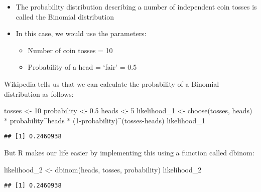 \documentclass[
  12pt,
]{article}
\newenvironment{Shaded}{\begin{snugshade}}{\end{snugshade}}
\newcommand{\DecValTok}[1]{\textcolor[rgb]{0.00,0.00,0.81}{#1}}
\newcommand{\FloatTok}[1]{\textcolor[rgb]{0.00,0.00,0.81}{#1}}
\newcommand{\FunctionTok}[1]{\textcolor[rgb]{0.00,0.00,0.00}{#1}}
\newcommand{\NormalTok}[1]{#1}
\newcommand{\OtherTok}[1]{\textcolor[rgb]{0.56,0.35,0.01}{#1}}
\newcommand{\SpecialCharTok}[1]{\textcolor[rgb]{0.00,0.00,0.00}{#1}}
\providecommand{\tightlist}{%
  \setlength{\itemsep}{0pt}\setlength{\parskip}{0pt}}
\begin{document}
\begin{itemize}
\tightlist
\item
  The probability distribution describing a number of independent coin
  tosses is called the Binomial distribution
\item
  In this case, we would use the parameters:

  \begin{itemize}
  \tightlist
  \item
    Number of coin tosses = 10
  \item
    Probability of a head = `fair' = 0.5
  \end{itemize}
\end{itemize}

Wikipedia tells us that we can calculate the probability of a Binomial
distribution as follows:

\begin{Shaded}
\begin{Highlighting}[]
\NormalTok{tosses }\OtherTok{\textless{}{-}} \DecValTok{10}
\NormalTok{probability }\OtherTok{\textless{}{-}} \FloatTok{0.5}
\NormalTok{heads }\OtherTok{\textless{}{-}} \DecValTok{5}
\NormalTok{likelihood\_1 }\OtherTok{\textless{}{-}} \FunctionTok{choose}\NormalTok{(tosses, heads) }\SpecialCharTok{*}\NormalTok{ probability}\SpecialCharTok{\^{}}\NormalTok{heads }\SpecialCharTok{*}
\NormalTok{                (}\DecValTok{1}\SpecialCharTok{{-}}\NormalTok{probability)}\SpecialCharTok{\^{}}\NormalTok{(tosses}\SpecialCharTok{{-}}\NormalTok{heads)}
\NormalTok{likelihood\_1}
\end{Highlighting}
\end{Shaded}

\begin{verbatim}
## [1] 0.2460938
\end{verbatim}

But R makes our life easier by implementing this using a function called
dbinom:

\begin{Shaded}
\begin{Highlighting}[]
\NormalTok{likelihood\_2 }\OtherTok{\textless{}{-}} \FunctionTok{dbinom}\NormalTok{(heads, tosses, probability)}
\NormalTok{likelihood\_2}
\end{Highlighting}
\end{Shaded}

\begin{verbatim}
## [1] 0.2460938
\end{verbatim}
\end{document}

